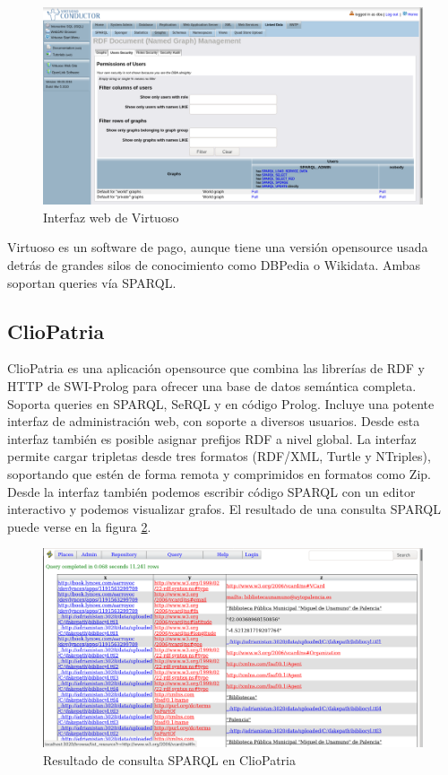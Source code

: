 \documentclass[openright,twoside,12pt]{book}
\begin{document}
\begin{figure}
    \centering
    \includegraphics[width=\textwidth]{virtuoso.png}
    \caption{Interfaz web de Virtuoso}
    \label{fig:virtuoso}
\end{figure}

Virtuoso es un software de pago, aunque tiene una versión opensource usada detrás de grandes silos de conocimiento como DBPedia o Wikidata. Ambas soportan queries vía SPARQL.

\subsection{ClioPatria}
ClioPatria es una aplicación opensource que combina las librerías de RDF y HTTP de SWI-Prolog para ofrecer una base de datos semántica completa\cite{cliopatria}.
Soporta queries en SPARQL, SeRQL y en código Prolog. Incluye una potente interfaz de administración web, con soporte a diversos usuarios. Desde esta interfaz también es posible asignar prefijos RDF a nivel global. La interfaz permite cargar tripletas desde tres formatos (RDF/XML, Turtle y NTriples), soportando que estén de forma remota y comprimidos en formatos como Zip. Desde la interfaz también podemos escribir código SPARQL con un editor interactivo y podemos visualizar grafos. El resultado de una consulta SPARQL puede verse en la figura \ref{fig:cliopatria}.

\begin{figure}
    \centering
    \includegraphics[width=\textwidth]{cliopatria.png}
    \caption{Resultado de consulta SPARQL en ClioPatria}
    \label{fig:cliopatria}
\end{figure}
\end{document}
